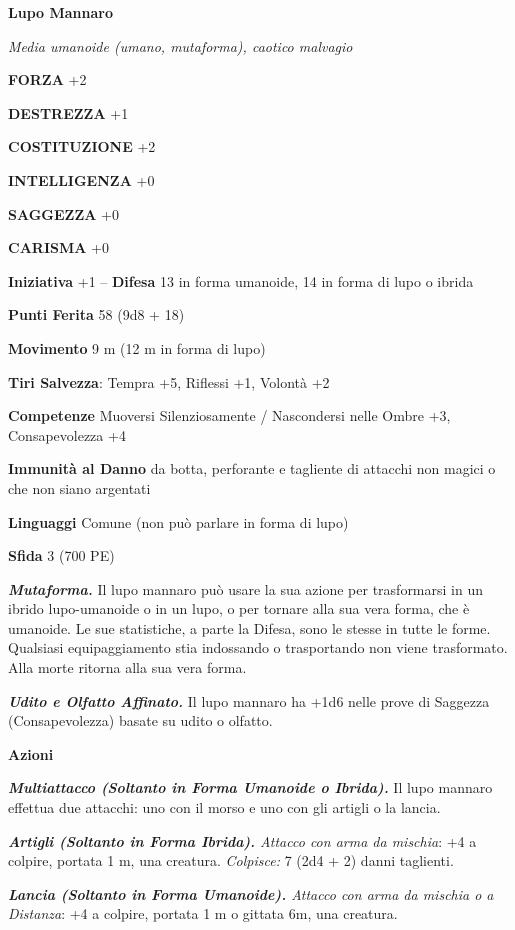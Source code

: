 \begin{multicols}{2}
\medskip{}\textbf{Lupo Mannaro}

\emph{Media umanoide (umano, mutaforma), caotico malvagio}

\textbf{FORZA} +2

\textbf{DESTREZZA} +1

\textbf{COSTITUZIONE} +2

\textbf{INTELLIGENZA} +0

\textbf{SAGGEZZA} +0

\textbf{CARISMA} +0

\textbf{Iniziativa} +1 -- \textbf{Difesa} 13 in forma umanoide, 14 in forma di lupo o ibrida

\textbf{Punti Ferita} 58 (9d8 + 18)

\textbf{Movimento} 9 m (12 m in forma di lupo)

\textbf{Tiri Salvezza}: Tempra +5, Riflessi +1, Volontà +2

\textbf{Competenze} Muoversi Silenziosamente / Nascondersi nelle Ombre +3, Consapevolezza +4

\textbf{Immunità al Danno} da botta, perforante e tagliente di attacchi non magici o che non siano argentati 

\textbf{Linguaggi} Comune (non può parlare in forma di lupo)

\textbf{Sfida} 3 (700 PE)

\emph{\textbf{Mutaforma.}} Il lupo mannaro può usare la sua azione per trasformarsi in un ibrido lupo-umanoide o in un lupo, o per tornare alla sua vera forma, che è umanoide. Le sue statistiche, a parte la Difesa, sono le stesse in tutte le forme. Qualsiasi equipaggiamento stia indossando o trasportando non viene trasformato. Alla morte ritorna alla sua vera forma.

\emph{\textbf{Udito e Olfatto Affinato.}} Il lupo mannaro ha +1d6 nelle prove di Saggezza (Consapevolezza) basate su udito o olfatto.

\textbf{Azioni}

\emph{\textbf{Multiattacco (Soltanto in Forma Umanoide o Ibrida).}} Il lupo mannaro effettua due attacchi: uno con il morso e uno con gli artigli o la lancia.

\emph{\textbf{Artigli (Soltanto in Forma Ibrida).} Attacco con arma da mischia}: +4 a colpire, portata 1 m, una creatura. \emph{Colpisce:} 7 (2d4 + 2) danni taglienti.

\emph{\textbf{Lancia (Soltanto in Forma Umanoide).} Attacco con arma da mischia o a Distanza}: +4 a colpire, portata 1 m o gittata 6m, una creatura.


\end{multicols}
